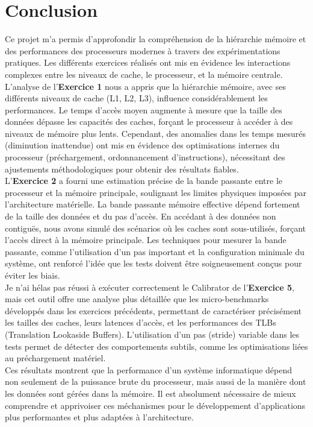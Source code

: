 \documentclass{rapport}
\begin{document}
            
        \section{Conclusion}

    Ce projet m'a permis d’approfondir la compréhension de la hiérarchie mémoire et des performances des processeurs modernes à travers des expérimentations pratiques. Les différents exercices réalisés ont mis en évidence les interactions complexes entre les niveaux de cache, le processeur, et la mémoire centrale.\\[2mm]
    L'analyse de l’\textbf{Exercice 1} nous a appris que la hiérarchie mémoire, avec ses différents niveaux de cache (L1, L2, L3), influence considérablement les performances. Le temps d'accès moyen augmente à mesure que la taille des données dépasse les capacités des caches, forçant le processeur à accéder à des niveaux de mémoire plus lents. Cependant, des anomalies dans les temps mesurés (diminution inattendue) ont mis en évidence des optimisations internes du processeur (préchargement, ordonnancement d’instructions), nécessitant des ajustements méthodologiques pour obtenir des résultats fiables.\\[2mm]
    L’\textbf{Exercice 2} a fourni une estimation précise de la bande passante entre le processeur et la mémoire principale, soulignant les limites physiques imposées par l’architecture matérielle. La bande passante mémoire effective dépend fortement de la taille des données et du pas d'accès. En accédant à des données non contiguës, nous avons simulé des scénarios où les caches sont sous-utilisés, forçant l'accès direct à la mémoire principale. Les techniques pour mesurer la bande passante, comme l'utilisation d'un pas important et la configuration minimale du système, ont renforcé l'idée que les tests doivent être soigneusement conçus pour éviter les biais.\\[2mm]
    Je n'ai hélas pas réussi à exécuter correctement le Calibrator de l’\textbf{Exercice 5}, mais cet outil offre une analyse plus détaillée que les micro-benchmarks développés dans les exercices précédents, permettant de caractériser précisément les tailles des caches, leurs latences d'accès, et les performances des TLBs (Translation Lookaside Buffers). L’utilisation d’un pas (stride) variable dans les tests permet de détecter des comportements subtils, comme les optimisations liées au préchargement matériel.\\[2mm]
    Ces résultats montrent que la performance d’un système informatique dépend non seulement de la puissance brute du processeur, mais aussi de la manière dont les données sont gérées dans la mémoire. Il est absolument nécessaire de mieux comprendre et apprivoiser ces méchanismes pour le développement d’applications plus performantes et plus adaptées à l’architecture.\\[2mm]

    
\end{document}

